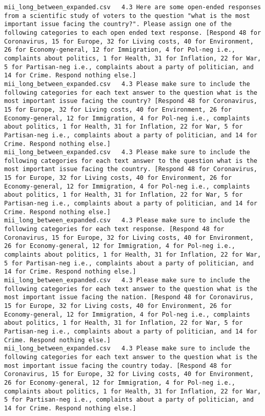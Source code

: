 \begin{lstlisting}[label=lst:promptvariants]
mii_long_between_expanded.csv	4.3	Here are some open-ended responses from a scientific study of voters to the question "what is the most important issue facing the country?". Please assign one of the following categories to each open ended text response. [Respond 48 for Coronavirus, 15 for Europe, 32 for Living costs, 40 for Environment, 26 for Economy-general, 12 for Immigration, 4 for Pol-neg i.e., complaints about politics, 1 for Health, 31 for Inflation, 22 for War, 5 for Partisan-neg i.e., complaints about a party of politician, and 14 for Crime. Respond nothing else.]
mii_long_between_expanded.csv	4.3	Please make sure to include the following categories for each text answer to the question what is the most important issue facing the country? [Respond 48 for Coronavirus, 15 for Europe, 32 for Living costs, 40 for Environment, 26 for Economy-general, 12 for Immigration, 4 for Pol-neg i.e., complaints about politics, 1 for Health, 31 for Inflation, 22 for War, 5 for Partisan-neg i.e., complaints about a party of politician, and 14 for Crime. Respond nothing else.]
mii_long_between_expanded.csv	4.3	Please make sure to include the following categories for each text answer to the question what is the most important issue facing the country. [Respond 48 for Coronavirus, 15 for Europe, 32 for Living costs, 40 for Environment, 26 for Economy-general, 12 for Immigration, 4 for Pol-neg i.e., complaints about politics, 1 for Health, 31 for Inflation, 22 for War, 5 for Partisan-neg i.e., complaints about a party of politician, and 14 for Crime. Respond nothing else.]
mii_long_between_expanded.csv	4.3	Please make sure to include the following categories for each text response. [Respond 48 for Coronavirus, 15 for Europe, 32 for Living costs, 40 for Environment, 26 for Economy-general, 12 for Immigration, 4 for Pol-neg i.e., complaints about politics, 1 for Health, 31 for Inflation, 22 for War, 5 for Partisan-neg i.e., complaints about a party of politician, and 14 for Crime. Respond nothing else.]
mii_long_between_expanded.csv	4.3	Please make sure to include the following categories for each text answer to the question what is the most important issue facing the nation. [Respond 48 for Coronavirus, 15 for Europe, 32 for Living costs, 40 for Environment, 26 for Economy-general, 12 for Immigration, 4 for Pol-neg i.e., complaints about politics, 1 for Health, 31 for Inflation, 22 for War, 5 for Partisan-neg i.e., complaints about a party of politician, and 14 for Crime. Respond nothing else.]
mii_long_between_expanded.csv	4.3	Please make sure to include the following categories for each text answer to the question what is the most important issue facing the country today. [Respond 48 for Coronavirus, 15 for Europe, 32 for Living costs, 40 for Environment, 26 for Economy-general, 12 for Immigration, 4 for Pol-neg i.e., complaints about politics, 1 for Health, 31 for Inflation, 22 for War, 5 for Partisan-neg i.e., complaints about a party of politician, and 14 for Crime. Respond nothing else.]

\end{lstlisting}
